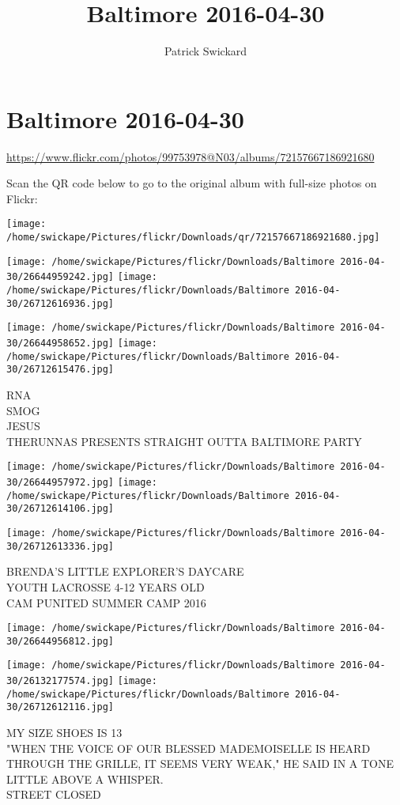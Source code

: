 \documentclass[10pt,letterpaper]{article}
\title{Baltimore 2016-04-30}
\author{Patrick Swickard}
\date{}
\begin{document}
\section*{Baltimore 2016-04-30}

\url{https://www.flickr.com/photos/99753978@N03/albums/72157667186921680}

Scan the QR code below to go to the original album with full-size photos on Flickr:

\texttt{[image: /home/swickape/Pictures/flickr/Downloads/qr/72157667186921680.jpg]}
\pagebreak

\texttt{[image: /home/swickape/Pictures/flickr/Downloads/Baltimore 2016-04-30/26644959242.jpg]}
\texttt{[image: /home/swickape/Pictures/flickr/Downloads/Baltimore 2016-04-30/26712616936.jpg]}

\texttt{[image: /home/swickape/Pictures/flickr/Downloads/Baltimore 2016-04-30/26644958652.jpg]}
\texttt{[image: /home/swickape/Pictures/flickr/Downloads/Baltimore 2016-04-30/26712615476.jpg]}

RNA\\
SMOG\\
JESUS\\
THERUNNAS PRESENTS STRAIGHT OUTTA BALTIMORE PARTY
\pagebreak

\texttt{[image: /home/swickape/Pictures/flickr/Downloads/Baltimore 2016-04-30/26644957972.jpg]}
\texttt{[image: /home/swickape/Pictures/flickr/Downloads/Baltimore 2016-04-30/26712614106.jpg]}

\texttt{[image: /home/swickape/Pictures/flickr/Downloads/Baltimore 2016-04-30/26712613336.jpg]}

BRENDA'S LITTLE EXPLORER'S DAYCARE\\
YOUTH LACROSSE 4{-}12 YEARS OLD\\
CAM PUNITED SUMMER CAMP 2016
\pagebreak

\texttt{[image: /home/swickape/Pictures/flickr/Downloads/Baltimore 2016-04-30/26644956812.jpg]}

\vspace{0.25in}
\texttt{[image: /home/swickape/Pictures/flickr/Downloads/Baltimore 2016-04-30/26132177574.jpg]}
\texttt{[image: /home/swickape/Pictures/flickr/Downloads/Baltimore 2016-04-30/26712612116.jpg]}

MY SIZE SHOES IS 13\\
"WHEN THE VOICE OF OUR BLESSED MADEMOISELLE IS HEARD THROUGH THE GRILLE, IT SEEMS VERY WEAK," HE SAID IN A TONE LITTLE ABOVE A WHISPER.\\
STREET CLOSED
\pagebreak
\end{document}
